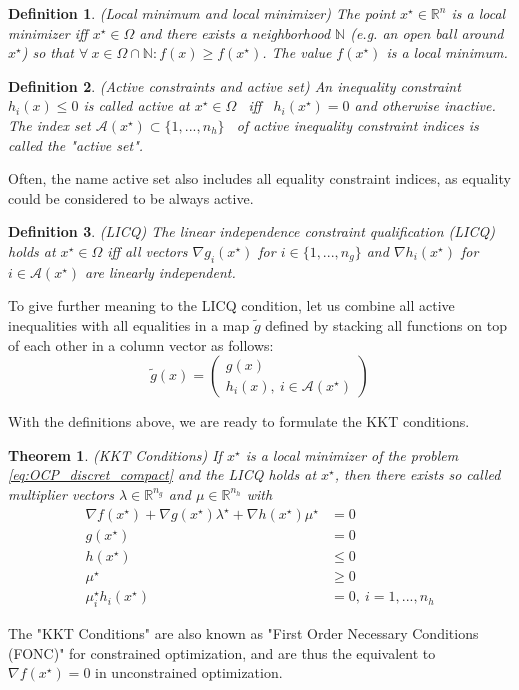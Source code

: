 \documentclass  [
  paper    = a4,
  BCOR     = 10mm,
  twoside,
  fontsize = 12pt,
  fleqn,
  toc      = bibnumbered,
  toc      = listofnumbered,
  numbers  = noendperiod,
  headings = normal,
  listof   = leveldown,
  version  = 3.03
]                                       {scrreprt}
\newcommand{\<}{\langle}
\renewcommand{\>}{\rangle}
\newtheorem{theorem}{Theorem}
\newtheorem{definition}{Definition}
\begin{document}
\begin{definition}(Local minimum and local minimizer) The point $x^\star \in \mathbb{R}^n$ is a local minimizer iff $x^\star \in  \Omega$ and there exists a neighborhood $\mathbb{N}$ (e.g. an open ball around $x^\star$) so that $ \forall \ x \in \Omega \cap \mathbb{N}: f(x) \geq f(x^\star)$. The value $f(x^\star)$ is a local minimum.
\end{definition}

\begin{definition}(Active constraints and active set) An inequality constraint $h_i(x) \leq 0$ is called active at $x^\star \in  \Omega$  iff  $h_i(x^\star) = 0$ and otherwise inactive. The index set $\mathcal{A}(x^\star) \subset \{1, ..., n_h\}$  of active inequality constraint indices is called the "active set".
\end{definition}
Often, the name active set also includes all equality constraint indices, as equality could be considered to be always active. 
\begin{definition} (LICQ) The linear independence constraint qualification (LICQ) holds at $x^\star \in  \Omega $ iff all vectors $\nabla g_i(x^\star)$ for $i \in \{1, ..., n_g \}$ and $\nabla h_i(x^\star)$ for  $i \in \mathcal{A}(x^\star)$ are linearly independent.
	\label{df_LICO}
\end{definition}
To give further meaning to the LICQ condition, let us combine all active inequalities with all equalities in a map $\tilde{g}$ defined by stacking all functions on top of each other in a column vector as follows:
\begin{equation}
	\tilde{g}(x) =  \begin{pmatrix} g(x) \\ h_i(x), \ i \in \mathcal{A}(x^\star)    \end{pmatrix}
\end{equation}


With the definitions above, we are ready to formulate the KKT conditions.
\begin{theorem}(KKT Conditions)
	If $x^\star$ is a local minimizer of the problem \ref{eq:OCP_discret_compact} and the LICQ holds at $x^\star$, then there exists
	so called multiplier vectors $\lambda \in \mathbb{R}^{n_g}$ and $\mu \in \mathbb{R}^{n_h}$ with 
	\begin{subequations}
		\begin{align}
			\nabla f(x^\star) + \nabla g(x^\star) \lambda^\star +  \nabla h(x^\star) \mu^\star &= 0 \\
			g(x^\star) &= 0   \\
			h(x^\star)&\leq 0  \label{kkt_smaller}\\
			\mu^\star & \geq 0 \\
			\mu_i^\star  h_i(x^\star) &=0 , \  i = 1, ..., n_h \label{kkt_active}
		\end{align}
	\end{subequations}
	\label{TH_KKT}
\end{theorem}
The "KKT Conditions" are also known as "First Order Necessary Conditions (FONC)" for constrained optimization, and are thus the equivalent to $\nabla f(x^\star)=0$ in unconstrained optimization.
\end{document}
